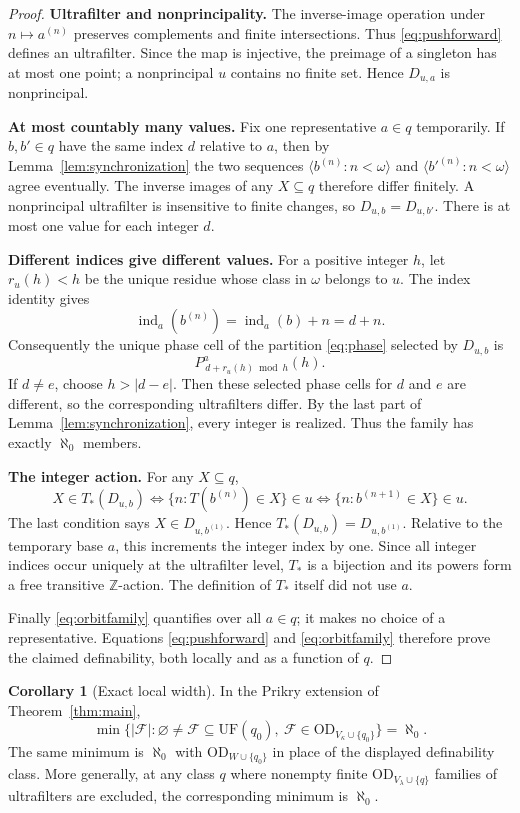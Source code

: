 \documentclass[11pt,letterpaper]{article}
\theoremstyle{definition}
\newtheorem{corollary}[definition]{Corollary}
\numberwithin{equation}{section}
\newcommand{\OD}{\mathrm{OD}}
\newcommand{\UF}{\mathrm{UF}}
\newcommand{\FFam}{\mathscr F}
\newcommand{\ind}{\operatorname{ind}}
\newcommand{\Z}{\mathbb Z}
\begin{document}
\begin{proof}
\textbf{Ultrafilter and nonprincipality.}
The inverse-image operation under $n\mapsto a^{(n)}$ preserves complements and finite intersections. Thus \eqref{eq:pushforward} defines an ultrafilter. Since the map is injective, the preimage of a singleton has at most one point; a nonprincipal $u$ contains no finite set. Hence $D_{u,a}$ is nonprincipal.

\textbf{At most countably many values.}
Fix one representative $a\in q$ temporarily. If $b,b'\in q$ have the same index $d$ relative to $a$, then by Lemma~\ref{lem:synchronization} the two sequences
$\langle b^{(n)}:n<\omega\rangle$ and
$\langle b'^{(n)}:n<\omega\rangle$ agree eventually. The inverse images of any $X\subseteq q$ therefore differ finitely. A nonprincipal ultrafilter is insensitive to finite changes, so $D_{u,b}=D_{u,b'}$. There is at most one value for each integer $d$.

\textbf{Different indices give different values.}
For a positive integer $h$, let $r_u(h)<h$ be the unique residue whose class in $\omega$ belongs to $u$. The index identity gives
\[
 \ind_a(b^{(n)})=\ind_a(b)+n=d+n.
\]
Consequently the unique phase cell of the partition \eqref{eq:phase} selected by $D_{u,b}$ is
\[
 P_{\,d+r_u(h)\bmod h}^{a}(h).
 \label{eq:chosenphase}\tag{13}
\]
If $d\ne e$, choose $h>|d-e|$. Then these selected phase cells for $d$ and $e$ are different, so the corresponding ultrafilters differ. By the last part of Lemma~\ref{lem:synchronization}, every integer is realized. Thus the family has exactly $\aleph_0$ members.

\textbf{The integer action.}
For any $X\subseteq q$,
\[
 X\in T_*(D_{u,b})
 \iff\{n:T(b^{(n)})\in X\}\in u
 \iff\{n:b^{(n+1)}\in X\}\in u.
\]
The last condition says $X\in D_{u,b^{(1)}}$. Hence
$T_*(D_{u,b})=D_{u,b^{(1)}}$. Relative to the temporary base $a$, this increments the integer index by one. Since all integer indices occur uniquely at the ultrafilter level, $T_*$ is a bijection and its powers form a free transitive $\Z$-action. The definition of $T_*$ itself did not use $a$.

Finally \eqref{eq:orbitfamily} quantifies over all $a\in q$; it makes no choice of a representative. Equations \eqref{eq:pushforward} and \eqref{eq:orbitfamily} therefore prove the claimed definability, both locally and as a function of $q$.
\end{proof}

\begin{corollary}[Exact local width]\label{cor:exactwidth}
In the Prikry extension of Theorem~\ref{thm:main},
\[
 \min\{|\FFam|:\varnothing\ne\FFam\subseteq\UF(q_0),\
              \FFam\in\OD_{V_\kappa\cup\{q_0\}}\}=\aleph_0.
 \label{eq:width}\tag{14}
\]
The same minimum is $\aleph_0$ with $\OD_{W\cup\{q_0\}}$ in place of the displayed definability class. More generally, at any class $q$ where nonempty finite $\OD_{V_\lambda\cup\{q\}}$ families of ultrafilters are excluded, the corresponding minimum is $\aleph_0$.
\end{corollary}
\end{document}
